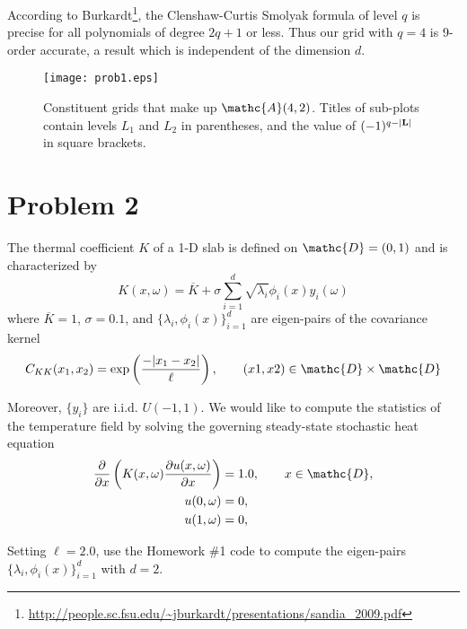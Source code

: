 \documentclass[11pt]{article}
\begin{document}
According to Burkardt\footnote{\url{http://people.sc.fsu.edu/~jburkardt/presentations/sandia_2009.pdf}}, the Clenshaw-Curtis Smolyak formula of level $q$ is precise for all polynomials of degree $2q+1$ or less. Thus our grid with $q=4$ is 9\th-order accurate, a result which is independent of the dimension $d$.

\begin{figure}[h]
\centering
\texttt{[image: prob1.eps]}
\caption{Constituent grids that make up $\mathc{A}(4,2)$. Titles of sub-plots contain levels $L_1$ and $L_2$ in parentheses, and the value of $(-1)^{q-|\mb{L}|}$ in square brackets.}
\label{fig:prob1}
\end{figure}

\section*{Problem 2} %

The thermal coefficient $K$ of a 1-D slab is defined on $\mathc{D} = (0,1)$ and is characterized by
\begin{equation}
K(x,\omega) = \overline{K} + \sigma \sum_{i=1}^d \sqrt{\lambda_i} \phi_i(x) y_i(\omega)
\end{equation}
where $\overline{K}=1$, $\sigma=0.1$, and $\{ \lambda_i, \phi_i(x) \}_{i=1}^d$ are eigen-pairs of the covariance kernel
\begin{equation}
C_{KK}(x_1,x_2) = \exp \left( \frac{- | x_1-x_2 | }{\ell} \right), \qquad (x1,x2) \in \mathc{D} \times \mathc{D}
\end{equation}

Moreover, $\{y_i\}$ are i.i.d. $U(-1,1)$. We would like to compute the statistics of the temperature field by solving the governing steady-state stochastic heat equation
\begin{equation}
\begin{aligned}
\pp{}{x} \left( K(x,\omega) \pp{u(x,\omega)}{x} \right) &= 1.0, \qquad x \in \mathc{D}, \\
u(0,\omega) &= 0, \\
u(1,\omega) &= 0,
\end{aligned}
\label{eq:pde}
\end{equation}

Setting $\ell = 2.0$, use the Homework \#1 code to compute the eigen-pairs $\{ \lambda_i, \phi_i(x) \}_{i=1}^d$ with $d=2$.
\end{document}
